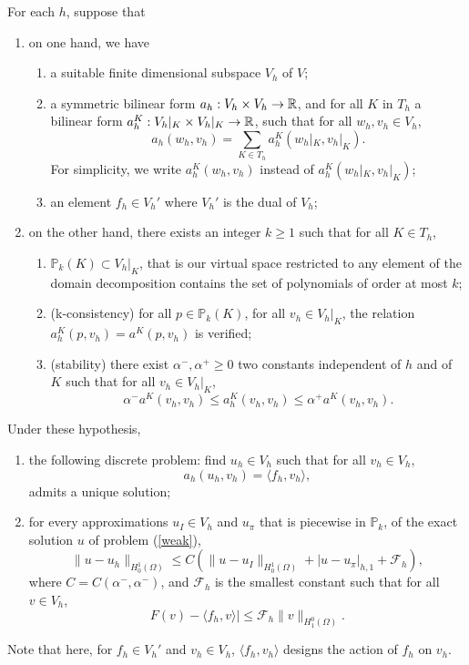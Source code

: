\begin{theorem}
For each $h$, suppose that
\begin{enumerate}
\item on one hand, we have \begin{enumerate}
\item a suitable finite dimensional subspace $V_h$ of $V$;
\item a symmetric bilinear form $a_h : V_h\times V_h \rightarrow \mathbb{R}$, and for all $K$ in $T_h$ a bilinear form $a_h^K:V_h|_K \times V_h|_K \rightarrow \mathbb{R}$, such that for all $w_h,v_h\in V_h$, 
$$ a_h(w_h, v_h) = \sum_{K\in T_h} a_h^K(w_h|_K,v_h|_K).$$ For simplicity, we write $a_h^K(w_h,v_h)$ instead of $a_h^K(w_h|_K,v_h|_K)$;
\item an element $f_h \in V_h'$ where $V_h'$ is the dual of $V_h$;
\end{enumerate}
\item on the other hand, there exists an integer $k\geq 1$ such that for all $K \in T_h$,
\begin{enumerate}
\item $\mathbb{P}_k(K) \subset V_h|_K$, that is our virtual space restricted to any element of the domain decomposition contains the set of polynomials of order at most $k$;
\item(k-consistency) for all $p\in \mathbb{P}_k(K)$, for all $v_h\in V_h|_K$, the relation $a_h^K(p, v_h) = a^K(p, v_h)$ is verified;
\item (stability) there exist $\alpha^-, \alpha^+ \geq 0$ two constants independent of $h$ and of $K$ such that for all $v_h\in V_h|_K$,
$$ \alpha^-a^K(v_h,v_h)\leq a_h^K(v_h,v_h)\leq \alpha^+a^K(v_h,v_h).$$
\end{enumerate}
\end{enumerate}
Under these hypothesis, 
\begin{enumerate}
\item the following discrete problem: find $u_h\in V_h$ such that for all $v_h \in V_h$, \begin{equation}\label{discretepb}
a_h(u_h,v_h) = \langle f_h,v_h\rangle,
\end{equation} admits a unique solution;
\item for every approximations $u_I\in V_h$ and $u_\pi$ that is piecewise in $\mathbb{P}_k$, of the exact solution $u$ of problem (\ref{weak}), $$\|u-u_h\|_{H_0^1(\Omega)} \leq C\left(\|u-u_I\|_{H_0^1(\Omega)} + |u-u_\pi|_{h,1} + \mathcal{F}_h\right),$$
where $C=C(\alpha^-,\alpha^-)$, and $\mathcal{F}_h$ is the smallest constant such that for all $v\in V_h$, 
\begin{equation}\label{calFh}
F(v)-\langle f_h,v\rangle| \leq \mathcal{F}_h\|v\|_{H^0_1(\Omega)}.
\end{equation}
\end{enumerate}
\end{theorem}
\begin{notation}
Note that here, for $f_h\in V_h'$ and $v_h \in V_h$, $\langle f_h,v_h\rangle$ designs the action of $f_h$ on $v_h$.
\end{notation}

